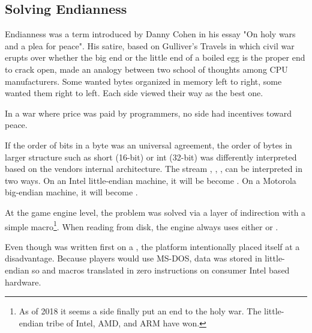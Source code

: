 \subsection{Solving Endianness}
Endianness was a term introduced by Danny Cohen in his essay "On holy wars and a plea for peace". His satire, based on Gulliver's Travels in which civil war erupts over whether the big end or the little end of a boiled egg is the proper end to crack open, made an analogy between two school of thoughts among CPU manufacturers. Some wanted bytes organized in memory left to right, some wanted them right to left. Each side viewed their way as the best one.\\
\par
In a war where price was paid by programmers, no side had incentives toward peace.



If the order of bits in a byte was an universal agreement, the order of bytes in larger structure such as short (16-bit) or int (32-bit) was differently interpreted based on the vendors internal architecture. The stream , , ,  can be interpreted in two ways. On an Intel little-endian machine, it will be become . On a Motorola big-endian machine, it will become .\\
\par
{}
\par
At the game engine level, the problem was solved via a layer of indirection with a simple macro\footnote{As of 2018 it seems a side finally put an end to the holy war. The little-endian tribe of Intel, AMD, and ARM have won.}. When reading from disk, the engine always uses either  or .\\
\par
{}
\par
{}
\par
Even though \doom{} was written first on a \NeXT, the platform intentionally placed itself at a disadvantage. Because players would use MS-DOS, data was stored in little-endian so  and  macros translated in zero instructions on consumer Intel based hardware.


